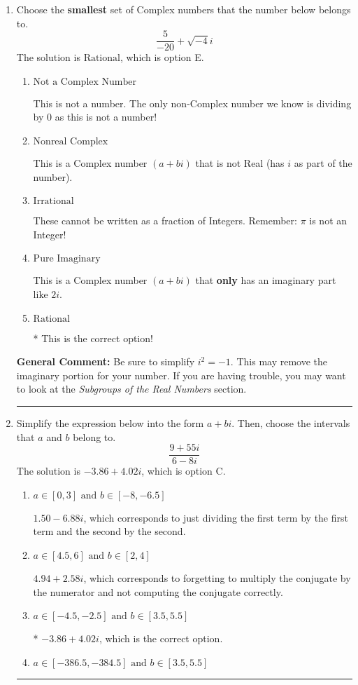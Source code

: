 \documentclass{extbook}[14pt]
\newcommand{\litem}[1]{\item #1

\rule{\textwidth}{0.4pt}}
\begin{document}
\begin{enumerate}\litem{
Choose the \textbf{smallest} set of Complex numbers that the number below belongs to.
\[ \frac{5}{-20}+\sqrt{-4}i \]The solution is \( \text{Rational} \), which is option E.\begin{enumerate}[label=\Alph*.]
\item \( \text{Not a Complex Number} \)

This is not a number. The only non-Complex number we know is dividing by 0 as this is not a number!
\item \( \text{Nonreal Complex} \)

This is a Complex number $(a+bi)$ that is not Real (has $i$ as part of the number).
\item \( \text{Irrational} \)

These cannot be written as a fraction of Integers. Remember: $\pi$ is not an Integer!
\item \( \text{Pure Imaginary} \)

This is a Complex number $(a+bi)$ that \textbf{only} has an imaginary part like $2i$.
\item \( \text{Rational} \)

* This is the correct option!
\end{enumerate}

\textbf{General Comment:} Be sure to simplify $i^2 = -1$. This may remove the imaginary portion for your number. If you are having trouble, you may want to look at the \textit{Subgroups of the Real Numbers} section.
}
\litem{
Simplify the expression below into the form $a+bi$. Then, choose the intervals that $a$ and $b$ belong to.
\[ \frac{9 + 55 i}{6 - 8 i} \]The solution is \( -3.86  + 4.02 i \), which is option C.\begin{enumerate}[label=\Alph*.]
\item \( a \in [0, 3] \text{ and } b \in [-8, -6.5] \)

 $1.50  - 6.88 i$, which corresponds to just dividing the first term by the first term and the second by the second.
\item \( a \in [4.5, 6] \text{ and } b \in [2, 4] \)

 $4.94  + 2.58 i$, which corresponds to forgetting to multiply the conjugate by the numerator and not computing the conjugate correctly.
\item \( a \in [-4.5, -2.5] \text{ and } b \in [3.5, 5.5] \)

* $-3.86  + 4.02 i$, which is the correct option.
\item \( a \in [-386.5, -384.5] \text{ and } b \in [3.5, 5.5] \)


\end{enumerate}}
\end{enumerate}
\end{document}
